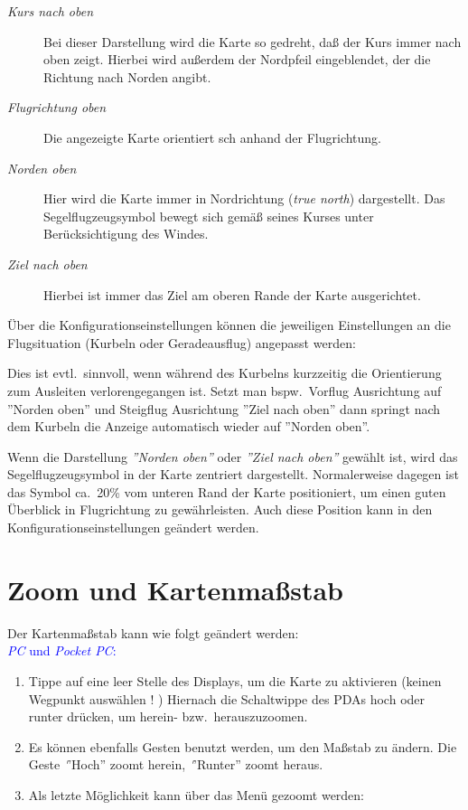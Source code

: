 \begin{description}
\item[\emph{Kurs nach oben}] Bei dieser Darstellung wird die Karte so gedreht, da\ss{} der Kurs immer nach oben zeigt. Hierbei wird außerdem der Nordpfeil eingeblendet, der die Richtung nach Norden angibt.
\item[\emph{Flugrichtung oben}] Die angezeigte Karte orientiert sch anhand der Flugrichtung.
\item[\emph{Norden oben}] Hier wird die Karte immer in Nordrichtung (\emph{true north}) dargestellt. Das Segelflugzeugsymbol bewegt sich gemäß seines Kurses unter Berücksichtigung des Windes.
\item[\emph{Ziel nach oben}] Hierbei ist immer das Ziel am oberen Rande der Karte ausgerichtet.
\end{description}

Über die Konfigurationseinstellungen können die jeweiligen Einstellungen an die Flugsituation (Kurbeln oder Geradeausflug) angepasst werden:

Dies ist evtl.\ sinnvoll, wenn während des Kurbelns kurzzeitig die Orientierung zum Ausleiten verlorengegangen ist.
Setzt man bspw.\  \textsf{Vorflug Ausrichtung} auf ''Norden oben'' und \textsf{Steigflug Ausrichtung} ''Ziel nach oben''  dann
springt nach dem Kurbeln die Anzeige automatisch wieder auf ''Norden oben''.

Wenn die Darstellung \emph{''Norden oben''} oder \emph{''Ziel nach oben''} gewählt ist, wird das Segelflugzeugsymbol in der Karte zentriert dargestellt. Normalerweise dagegen ist das Symbol ca.\ 20\% vom unteren Rand der Karte positioniert, um einen guten Überblick in Flugrichtung zu gewährleisten. Auch diese Position kann in den Konfigurationseinstellungen geändert werden.
\section{Zoom und Kartenmaßstab}\label{zoom}\label{kartenmasstab}
Der Kartenmaßstab kann wie folgt geändert werden: \\
\textcolor{blue}{\textsl{PC} und  \textsl{Pocket PC}:}
\begin{enumerate}
 \item Tippe auf eine leer Stelle des Displays, um die Karte zu aktivieren (keinen Wegpunkt auswählen ! )
        Hiernach die Schaltwippe des \textsf{PDA}s hoch oder runter drücken, um herein- bzw.\ herauszuzoomen.
 \item Es können ebenfalls Gesten benutzt werden, um den Maßstab zu ändern.
      Die  Geste {\emph ''Hoch''} zoomt herein,  {\emph ''Runter''} zoomt heraus.
 \item Als letzte Möglichkeit kann über das Menü gezoomt werden:
\end{enumerate}

